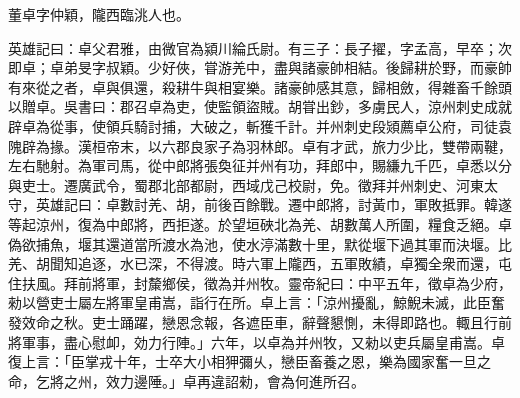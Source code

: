 
\begin{pinyinscope}
董卓字仲穎，隴西臨洮人也。

英雄記曰：卓父君雅，由微官為潁川綸氏尉。有三子：長子擢，字孟高，早卒；次即卓；卓弟旻字叔穎。少好俠，甞游羌中，盡與諸豪帥相結。後歸耕於野，而豪帥有來從之者，卓與俱還，殺耕牛與相宴樂。諸豪帥感其意，歸相斂，得雜畜千餘頭以贈卓。吳書曰：郡召卓為吏，使監領盜賊。胡甞出鈔，多虜民人，涼州刺史成就辟卓為從事，使領兵騎討捕，大破之，斬獲千計。并州刺史段熲薦卓公府，司徒袁隗辟為掾。漢桓帝末，以六郡良家子為羽林郎。卓有才武，旅力少比，雙帶兩鞬，左右馳射。為軍司馬，從中郎將張奐征并州有功，拜郎中，賜縑九千匹，卓悉以分與吏士。遷廣武令，蜀郡北部都尉，西域戊己校尉，免。徵拜并州刺史、河東太守，英雄記曰：卓數討羌、胡，前後百餘戰。遷中郎將，討黃巾，軍敗抵罪。韓遂等起涼州，復為中郎將，西拒遂。於望垣硤北為羌、胡數萬人所圍，糧食乏絕。卓偽欲捕魚，堰其還道當所渡水為池，使水渟滿數十里，默從堰下過其軍而決堰。比羌、胡聞知追逐，水已深，不得渡。時六軍上隴西，五軍敗績，卓獨全衆而還，屯住扶風。拜前將軍，封斄鄉侯，徵為并州牧。靈帝紀曰：中平五年，徵卓為少府，勑以營吏士屬左將軍皇甫嵩，詣行在所。卓上言：「涼州擾亂，鯨鯢未滅，此臣奮發效命之秋。吏士踊躍，戀恩念報，各遮臣車，辭聲懇惻，未得即路也。輙且行前將軍事，盡心慰卹，効力行陣。」六年，以卓為并州牧，又勑以吏兵屬皇甫嵩。卓復上言：「臣掌戎十年，士卒大小相狎彌乆，戀臣畜養之恩，樂為國家奮一旦之命，乞將之州，效力邊陲。」卓再違詔勑，會為何進所召。


\end{pinyinscope}

